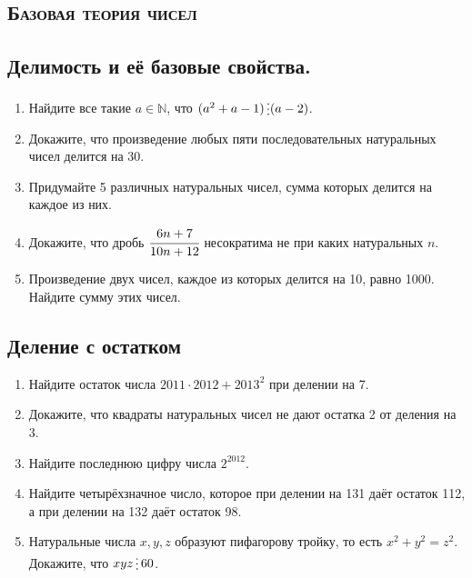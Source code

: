 \documentclass[11pt]{article}
\begin{document}
\begin{center}
\section*{\textsc{Базовая теория чисел}}
\end{center}
\subsection{Делимость и её базовые свойства.}
    \begin{enumerate}[start=1,label={\bfseries \arabic*.}]
        \item Найдите все такие $a \in \mathbb{N}$, что $(a^2 + a - 1) \divisible (a - 2)$.

        \item Докажите, что произведение любых пяти последовательных натуральных чисел делится на 30.

        \item Придумайте 5 различных натуральных чисел, сумма которых делится на каждое из них.

        \item Докажите, что дробь $\cfrac{6n + 7}{10n + 12}$ несократима не при каких натуральных $n$.

        \item Произведение двух чисел, каждое из которых делится на 10, равно 1000. Найдите сумму этих чисел.

    \end{enumerate}
\subsection{Деление с остатком}
    \begin{enumerate}[start=6,label={\bfseries \arabic*.}]
        \item Найдите остаток числа $2011 \cdot 2012 + 2013^2$ при делении на 7.

        \item Докажите, что квадраты натуральных чисел не дают остатка 2 от деления на 3.

        \item Найдите последнюю цифру числа $2^2012$.

        \item Найдите четырёхзначное число, которое при делении на 131 даёт остаток 112, а при делении на 132 даёт остаток 98.

        \item  Натуральные числа $x, y, z$ образуют пифагорову тройку, то есть $x^2 + y^2 = z^2$. Докажите, что $x y z \divisible 60$.
    \end{enumerate}
\end{document}
